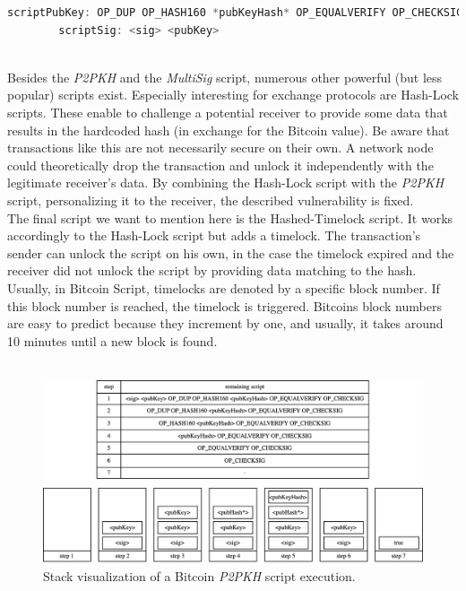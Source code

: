 \documentclass{cacthesis}
\newcounter{protocol}
\begin{document}
        \begin{lstlisting}[language=JavaScript, basicstyle=\footnotesize, caption=Bitcoin \textit{P2PKH} script, captionpos=b, backgroundcolor=\color{backcolour}, label=lst:p2pkh]
        scriptPubKey: OP_DUP OP_HASH160 *pubKeyHash* OP_EQUALVERIFY OP_CHECKSIG
        scriptSig: <sig> <pubKey>
        \end{lstlisting} \\
        
        Besides the \textit{P2PKH} and the \textit{MultiSig} script, numerous other powerful (but less popular) scripts exist. Especially interesting for exchange protocols are Hash-Lock scripts. These enable to challenge a potential receiver to provide some data that results in the hardcoded hash (in exchange for the Bitcoin value). Be aware that transactions like this are not necessarily secure on their own. A network node could theoretically drop the transaction and unlock it independently with the legitimate receiver's data. By combining the Hash-Lock script with the \textit{P2PKH} script, personalizing it to the receiver, the described vulnerability is fixed. \\
        The final script we want to mention here is the Hashed-Timelock script. It works accordingly to the Hash-Lock script but adds a timelock. The transaction's sender can unlock the script on his own, in the case the timelock expired and the receiver did not unlock the script by providing data matching to the hash. Usually, in Bitcoin Script, timelocks are denoted by a specific block number. If this block number is reached, the timelock is triggered. Bitcoins block numbers are easy to predict because they increment by one, and usually, it takes around 10 minutes until a new block is found. \\\\
    
        \begin{figure}
          \includegraphics[width=\linewidth]{images/p2pkh_execution_figure.png}
          \caption{Stack visualization of a Bitcoin \textit{P2PKH} script execution.}
          \label{fig:p2pkh}
        \end{figure}
\end{document}
